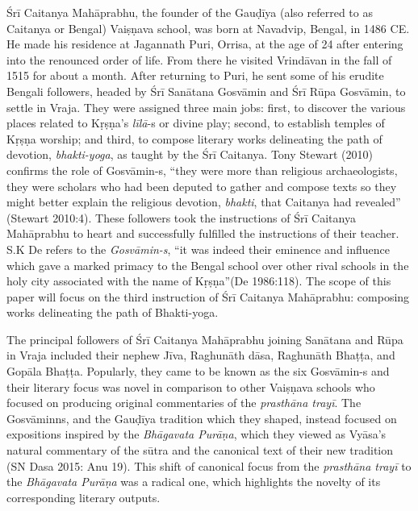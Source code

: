 Śrī Caitanya Mahāprabhu, the founder of the Gauḍīya (also referred to as Caitanya or Bengal) Vaiṣṇava school, was born at Navadvip, Bengal, in 1486 CE\@. He made his residence at Jagannath Puri, Orrisa, at the age of 24 after entering into the renounced order of life. From there he visited Vrindāvan in the fall of 1515 for about a month. After returning to Puri, he sent some of his erudite Bengali followers, headed by Śrī Sanātana Gosvāmin and Śrī Rūpa Gosvāmin, to settle in Vraja. They were assigned three main jobs: first, to discover the various places related to Kṛṣṇa’s {\sl līlā}-s or divine play; second, to establish temples of Kṛṣṇa worship; and third, to compose literary works delineating the path of devotion, {\sl bhakti-yoga}, as taught by the Śrī Caitanya. Tony Stewart (2010) confirms the role of Gosvāmin-s, “they were more than religious archaeologists, they were scholars who had been deputed to gather and compose texts so they might better explain the religious devotion, {\sl bhakti}, that Caitanya had revealed” (Stewart 2010:4). These followers took the instructions of Śrī Caitanya Mahāprabhu to heart and successfully fulfilled the instructions of their teacher. S.K De refers to the {\sl Gosvāmin-s}, “it was indeed their eminence and influence which gave a marked primacy to the Bengal school over other rival schools in the holy city associated with the name of Kṛṣṇa”(De 1986:118). The scope of this paper will focus on the third instruction of Śrī Caitanya Mahāprabhu: composing works delineating the path of Bhakti-yoga. 

The principal followers of Śrī Caitanya Mahāprabhu joining Sanātana and Rūpa in Vraja included their nephew Jīva, Raghunāth dāsa, Raghunāth Bhaṭṭa, and Gopāla Bhaṭṭa. Popularly, they came to be known as the six Gosvāmin-s and their literary focus was novel in comparison to other Vaiṣṇava schools who focused on producing original commentaries of the {\sl prasthāna trayī}. The Gosvāminns, and the Gauḍīya tradition which they shaped, instead focused on expositions inspired by the {\sl Bhāgavata Purāṇa}, which they viewed as Vyāsa’s natural commentary of the sūtra and the canonical text of their new tradition (SN Dasa 2015: Anu 19). This shift of canonical focus from the {\sl prasthāna trayī} to the {\sl Bhāgavata Purāṇa} was a radical one, which highlights the novelty of its corresponding literary outputs. 

